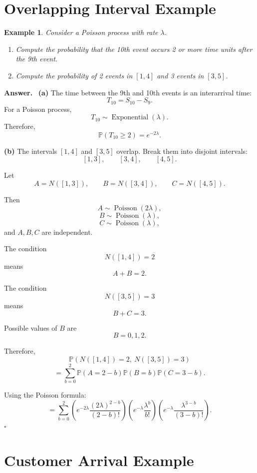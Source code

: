 \documentclass[12pt,a4paper]{article}
\theoremstyle{lecturestyle}
\newtheorem{example}{Example}
\newenvironment{answer}
{\par\textbf{Answer.}\ }
{\hfill$\square$\par}
\newcommand{\Prob}{\mathbb{P}}
\begin{document}
\section{Overlapping Interval Example}

\begin{example}
Consider a Poisson process with rate $\lambda$.

\begin{enumerate}[label=(\alph*)]
    \item Compute the probability that the 10th event occurs 2 or more time units after the 9th event.
    \item Compute the probability of 2 events in $[1,4]$ and 3 events in $[3,5]$.
\end{enumerate}
\end{example}

\begin{answer}
\textbf{(a)} The time between the 9th and 10th events is an interarrival time:
\[
T_{10}=S_{10}-S_9.
\]
For a Poisson process,
\[
T_{10}\sim \operatorname{Exponential}(\lambda).
\]
Therefore,
\[
\Prob(T_{10}\geq2)=e^{-2\lambda}.
\]

\textbf{(b)} The intervals $[1,4]$ and $[3,5]$ overlap. Break them into disjoint intervals:
\[
[1,3],\qquad [3,4],\qquad [4,5].
\]

Let
\[
A=N([1,3]),\qquad B=N([3,4]),\qquad C=N([4,5]).
\]

Then
\[
A\sim \operatorname{Poisson}(2\lambda),
\]
\[
B\sim \operatorname{Poisson}(\lambda),
\]
\[
C\sim \operatorname{Poisson}(\lambda),
\]
and $A,B,C$ are independent.

The condition
\[
N([1,4])=2
\]
means
\[
A+B=2.
\]

The condition
\[
N([3,5])=3
\]
means
\[
B+C=3.
\]

Possible values of $B$ are
\[
B=0,1,2.
\]

Therefore,
\[
\Prob(N([1,4])=2,\ N([3,5])=3)
\]
\[
=
\sum_{b=0}^{2}\Prob(A=2-b)\Prob(B=b)\Prob(C=3-b).
\]

Using the Poisson formula:
\[
=
\sum_{b=0}^{2}
\left(e^{-2\lambda}\frac{(2\lambda)^{2-b}}{(2-b)!}\right)
\left(e^{-\lambda}\frac{\lambda^b}{b!}\right)
\left(e^{-\lambda}\frac{\lambda^{3-b}}{(3-b)!}\right).
\]
\end{answer}

\section{Customer Arrival Example}
\end{document}
